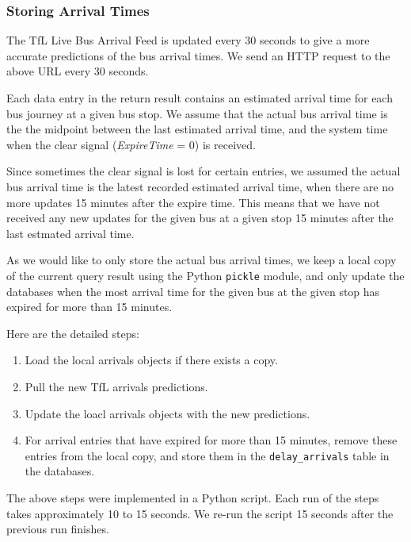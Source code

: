 \subsubsection{Storing Arrival Times}
\par The TfL Live Bus Arrival Feed is updated every 30 seconds to give a more accurate predictions of the bus arrival times. We send an HTTP request to the above URL every 30 seconds.

\par Each data entry in the return result contains an estimated arrival time for each bus journey at a given bus stop. We assume that the actual bus arrival time is the the midpoint between the last estimated arrival time, and the system time when the clear signal (\textit{ExpireTime} = 0) is received.

\par Since sometimes the clear signal is lost for certain entries, we assumed the actual bus arrival time is the latest recorded estimated arrival time, when there are no more updates 15 minutes after the expire time. This means that we have not received any new updates for the given bus at a given stop 15 minutes after the last estmated arrival time.

\par As we would like to only store the actual bus arrival times, we keep a local copy of the current query result using the Python \texttt{pickle} module\cite{pickle}, and only update the databases when the most arrival time for the given bus at the given stop has expired for more than 15 minutes.

\par Here are the detailed steps:

\begin{enumerate}
  \item Load the local arrivals objects if there exists a copy.
  \item Pull the new TfL arrivals predictions.
  \item Update the loacl arrivals objects with the new predictions.
  \item For arrival entries that have expired for more than 15 minutes, remove these entries from the local copy, and store them in the \texttt{delay\_arrivals} table in the databases.
\end{enumerate}

The above steps were implemented in a Python script. Each run of the steps takes approximately 10 to 15 seconds. We re-run the script 15 seconds after the previous run finishes.
\label{sec:arrivals_daemon}

